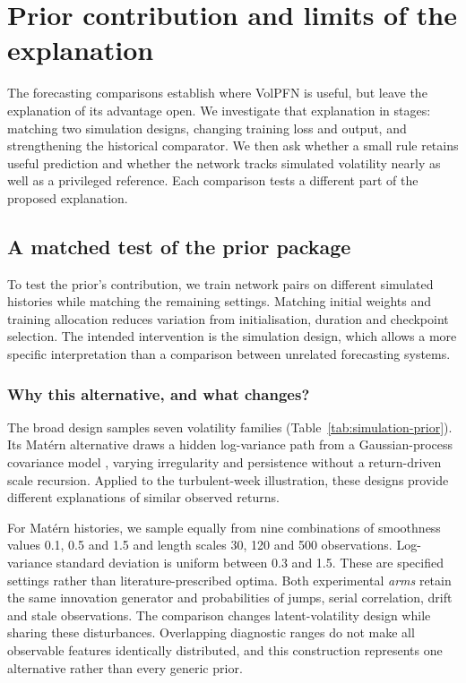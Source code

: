 \chapter{Prior contribution and limits of the explanation}
\label{ch:analysis}

The forecasting comparisons establish where VolPFN is useful, but leave the explanation of its advantage open. We investigate that explanation in stages: matching two simulation designs, changing training loss and output, and strengthening the historical comparator. We then ask whether a small rule retains useful prediction and whether the network tracks simulated volatility nearly as well as a privileged reference. Each comparison tests a different part of the proposed explanation.

\section{A matched test of the prior package}
\label{sec:matched-prior}

To test the prior's contribution, we train network pairs on different simulated histories while matching the remaining settings. Matching initial weights and training allocation reduces variation from initialisation, duration and checkpoint selection. The intended intervention is the simulation design, which allows a more specific interpretation than a comparison between unrelated forecasting systems.

\subsection{Why this alternative, and what changes?}

The broad design samples seven volatility families (Table~\ref{tab:simulation-prior}). Its Mat\'ern alternative draws a hidden log-variance path from a Gaussian-process covariance model \citep{rasmussen2006gaussian}, varying irregularity and persistence without a return-driven scale recursion. Applied to the turbulent-week illustration, these designs provide different explanations of similar observed returns.

For Mat\'ern histories, we sample equally from nine combinations of smoothness values 0.1, 0.5 and 1.5 and length scales 30, 120 and 500 observations. Log-variance standard deviation is uniform between 0.3 and 1.5. These are specified settings rather than literature-prescribed optima. Both experimental \emph{arms} retain the same innovation generator and probabilities of jumps, serial correlation, drift and stale observations. The comparison changes latent-volatility design while sharing these disturbances. Overlapping diagnostic ranges do not make all observable features identically distributed, and this construction represents one alternative rather than every generic prior.

